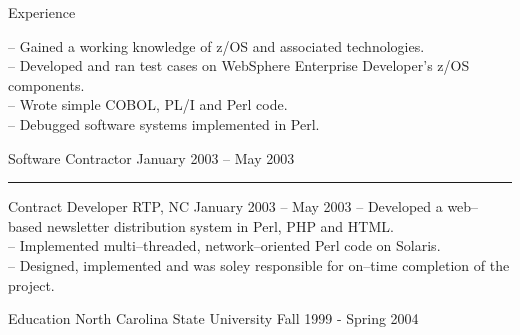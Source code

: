 \documentclass[letterpaper, 11pt]{article}
\begin{document}
\begin{resume}
\begin{category}{Experience}
\begin{block}
                -- Gained a working knowledge of z/OS and associated technologies.                      \\
                -- Developed and ran test cases on WebSphere Enterprise Developer's z/OS components.    \\
                -- Wrote simple COBOL, PL/I and Perl code.                                              \\
                -- Debugged software systems implemented in Perl.
                \bigskip
            \end{block}
             {Software Contractor}
                     {}               {January 2003 -- May 2003}
            \rule{\textwidth}{1pt}
            \begin{block}
                 {Contract Developer}
                         {RTP, NC}        {January 2003 -- May 2003}
                -- Developed a web--based newsletter distribution system in Perl, PHP and HTML.            \\
                -- Implemented multi--threaded, network--oriented Perl code on Solaris.                    \\
                -- Designed, implemented and was soley responsible for on--time completion of the project.
            \end{block}
        \end{category}
        \begin{category}{Education}
             {North Carolina State University}
                     { }                        {Fall 1999 - Spring 2004}
        \end{category}
    \end{resume}
\end{document}
